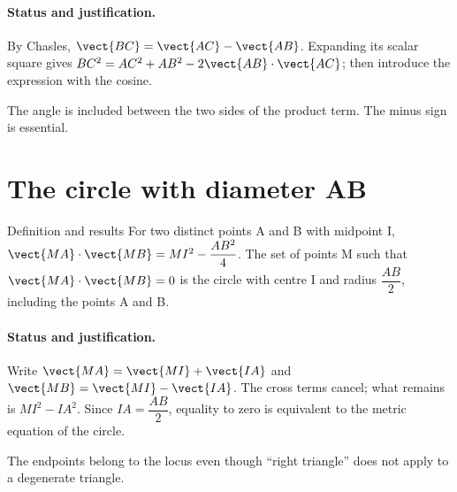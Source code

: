 \paragraph{Status and justification.} By Chasles, $\vect{BC}=\vect{AC}-\vect{AB}$. Expanding its scalar square gives $BC^2=AC^2+AB^2-2\vect{AB}\cdot\vect{AC}$; then introduce the expression with the cosine.
\label{C03-EX4}
\begin{erreur}The angle is included between the two sides of the product term. The minus sign is essential.\end{erreur}
\label{C03-AP4}
\section{The circle with diameter AB}\label{C03-U5}
\begin{repere}{Definition and results}
For two distinct points A and B with midpoint I, $\vect {MA}\cdot \vect {MB}=MI^2-\dfrac{AB^2}{4}$. The set of points M such that $\vect{MA}\cdot\vect{MB}=0$ is the circle with centre I and radius $\dfrac{AB}{2}$, including the points A and B.
\end{repere}
\paragraph{Status and justification.} Write $\vect{MA}=\vect{MI}+\vect{IA}$ and $\vect{MB}=\vect{MI}-\vect{IA}$. The cross terms cancel; what remains is $MI^2-IA^2$. Since $IA=\dfrac{AB}{2}$, equality to zero is equivalent to the metric equation of the circle.
\label{C03-EX5}

\begin{erreur}The endpoints belong to the locus even though ``right triangle'' does not apply to a degenerate triangle.\end{erreur}
\label{C03-AP5}
